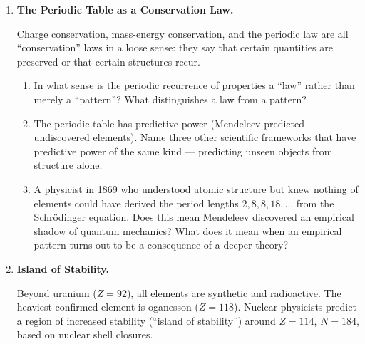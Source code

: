 \documentclass[12pt, a4paper]{book}
\begin{document}
\begin{deepbox}
\begin{enumerate}[label=\textbf{D\arabic*.}]
  \item \textbf{The Periodic Table as a Conservation Law.}

        Charge conservation, mass-energy conservation, and
        the periodic law are all ``conservation'' laws in
        a loose sense: they say that certain quantities
        are preserved or that certain structures recur.

        \begin{enumerate}[label=(\alph*)]
          \item In what sense is the periodic recurrence of
                properties a ``law'' rather than merely
                a ``pattern''?
                What distinguishes a law from a pattern?
          \item The periodic table has predictive power
                (Mendeleev predicted undiscovered elements).
                Name three other scientific frameworks that
                have predictive power of the same kind ---
                predicting unseen objects from structure alone.
          \item A physicist in 1869 who understood atomic
                structure but knew nothing of elements
                could have derived the period lengths
                $2, 8, 8, 18, \ldots$ from the Schr\"{o}dinger
                equation.
                Does this mean Mendeleev discovered an
                empirical shadow of quantum mechanics?
                What does it mean when an empirical pattern
                turns out to be a consequence of a deeper theory?
        \end{enumerate}

  \item \textbf{Island of Stability.}

        Beyond uranium ($Z=92$), all elements are synthetic
        and radioactive.
        The heaviest confirmed element is oganesson ($Z=118$).
        Nuclear physicists predict a region of increased
        stability (``island of stability'') around $Z=114$,
        $N=184$, based on nuclear shell closures.


\end{enumerate}
\end{deepbox}
\end{document}
